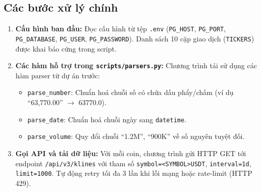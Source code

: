 \subsection{Các bước xử lý chính}
\begin{enumerate}[label=\alph*)]
    \item \textbf{Cấu hình ban đầu:}
    Đọc cấu hình từ tệp \texttt{.env} (\texttt{PG\_HOST}, \texttt{PG\_PORT}, \texttt{PG\_DATABASE}, \texttt{PG\_USER}, \texttt{PG\_PASSWORD}). Danh sách 10 cặp giao dịch (\texttt{TICKERS}) được khai báo cứng trong script.

    \item \textbf{Các hàm hỗ trợ trong \texttt{scripts/parsers.py}:}
    Chương trình tái sử dụng các hàm parser từ dự án trước:
    \begin{itemize}
        \item \texttt{parse\_number}: Chuẩn hoá chuỗi số có chứa dấu phẩy/chấm (ví dụ ``63{,}770.00'' $\rightarrow$ 63770.0).
        \item \texttt{parse\_date}: Chuẩn hoá chuỗi ngày sang \texttt{datetime}.
        \item \texttt{parse\_volume}: Quy đổi chuỗi ``1.2M'', ``900K'' về số nguyên tuyệt đối.
    \end{itemize}

    \item \textbf{Gọi API và tải dữ liệu:}
    Với mỗi coin, chương trình gửi HTTP GET tới endpoint \texttt{/api/v3/klines} với tham số \texttt{symbol=<SYMBOL>USDT}, \texttt{interval=1d}, \texttt{limit=1000}. Tự động retry tối đa 3 lần khi lỗi mạng hoặc rate-limit (HTTP 429).


\end{enumerate}
